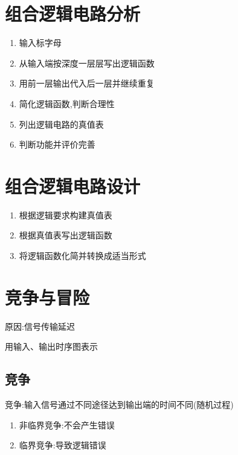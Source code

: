 \newpage

\section{组合逻辑电路分析}

\begin{enumerate}

    \item 输入标字母
    \item 从输入端按深度一层层写出逻辑函数
    \item 用前一层输出代入后一层并继续重复
    \item 简化逻辑函数,判断合理性
    \item 列出逻辑电路的真值表
    \item 判断功能并评价完善

\end{enumerate}

\section{组合逻辑电路设计}

\begin{enumerate}

    \item 根据逻辑要求构建真值表
    \item 根据真值表写出逻辑函数
    \item 将逻辑函数化简并转换成适当形式

\end{enumerate}

\newpage

\section{竞争与冒险}

原因:信号传输延迟

用输入、输出时序图表示

\subsection{竞争}

竞争:输入信号通过不同途径达到输出端的时间不同(随机过程)

\begin{enumerate}

    \item 非临界竞争:不会产生错误
    \item 临界竞争:导致逻辑错误

\end{enumerate}

